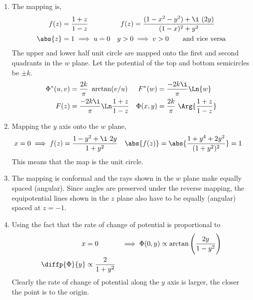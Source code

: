 \begin{enumerate}
    \item The mapping is,
          \begin{align}
              f(z)    & = \frac{1 + z}{1 - z}                              &
              f(z)    & = \frac{(1 - x^2 - y^2) + \i\ (2y)}{(1-x)^2 + y^2}   \\
              \abs{z} & = 1 \implies u = 0                                 &
              y > 0   & \implies v > 0 \qquad \text{and vice versa}
          \end{align}
          The upper and lower half unit circle are mapped onto the first and second
          quadrants in the $ w $ plane. Let the potential of the top and bottom
          semicircles be $ \pm k $.
          \begin{align}
              \Phi^*(u, v) & = \frac{2k}{\pi}\ \arctan(v/u)              &
              F^*(w)       & = \frac{-2k\i}{\pi} \Ln{w}                    \\
              F(z)         & = \frac{-2k\i}{\pi} \Ln \frac{1 + z}{1 - z} &
              \Phi(x, y)   & = \frac{2k}{\pi}\ \Arg{\frac{1+z}{1-z}}
          \end{align}

    \item Mapping the $ y $ axis onto the $ w $ plane,
          \begin{align}
              x = 0      & \implies f(z) = \frac{1-y^2 + \i\ 2y}{1 + y^2} &
              \abs{f(z)} & = \abs{\frac{1 + y^4 + 2y^2}{(1 + y^2)^2}} = 1
          \end{align}
          This means that the map is the unit circle.

    \item The mapping is conformal and the rays shown in the $ w $ plane make equally
          spaced (angular). Since angles are preserved under the reverse mapping, the
          equipotential lines shown in the $ z $ plane also have to be equally (angular)
          spaced at $ z = -1 $.

    \item Using the fact that the rate of change of potential is proportional to
          \begin{align}
              x                   & = 0                                           &
              \implies \Phi(0, y) & \propto \arctan\Bigg(\frac{2y}{1 - y^2}\Bigg)   \\
              \diffp{\Phi}{y}     & \propto \frac{2}{1 + y^2}
          \end{align}
          Clearly the rate of change of potential along the $ y $ axis is larger, the
          closer the point is to the origin.


\end{enumerate}
